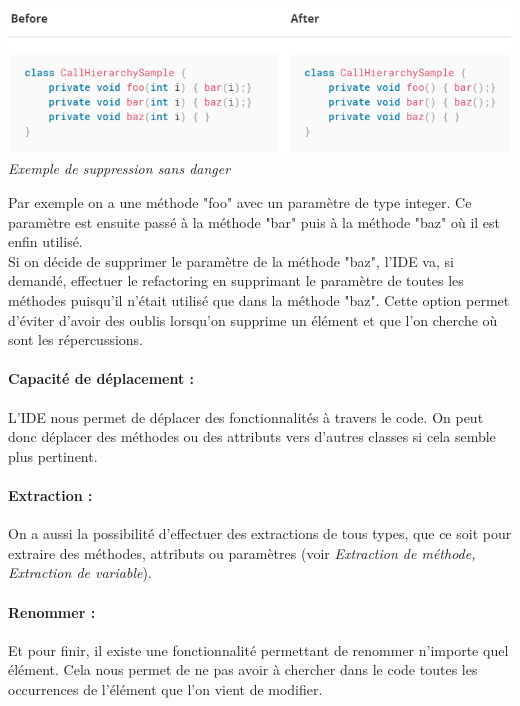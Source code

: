 \documentclass[a4paper,twoside,12pt,openright]{report}
\begin{document}
\begin{center}
\includegraphics[scale=0.8]{Image/SafeDelete.png}\\
\itshape{Exemple de suppression sans  danger \cite{ref9}}
\end{center}

Par exemple on a une méthode "foo" avec un paramètre de type integer. Ce paramètre est ensuite passé à la méthode "bar" puis à la méthode "baz" où il est enfin utilisé.\\
Si on décide de supprimer le paramètre de la méthode "baz", l'IDE va, si demandé, effectuer le refactoring en supprimant le paramètre de toutes les méthodes puisqu'il n'était utilisé que dans la méthode "baz".
Cette option permet d'éviter d'avoir des oublis lorsqu'on supprime un élément et que l'on cherche où sont les répercussions.\\

\paragraph{Capacité de déplacement :}
L'IDE nous permet de déplacer des fonctionnalités à travers le code. On peut donc déplacer des méthodes ou des attributs vers d'autres classes si cela semble plus pertinent.\\

\paragraph{Extraction :}
On a aussi la possibilité d'effectuer des extractions de tous types, que ce soit pour extraire des méthodes, attributs ou paramètres (voir \textit{Extraction de méthode, Extraction de variable}).\\

\paragraph{Renommer :}
Et pour finir, il existe une fonctionnalité permettant de renommer n'importe quel élément. Cela nous permet de ne pas avoir à chercher dans le code toutes les occurrences de l'élément que l'on vient de modifier.\\
\end{document}
